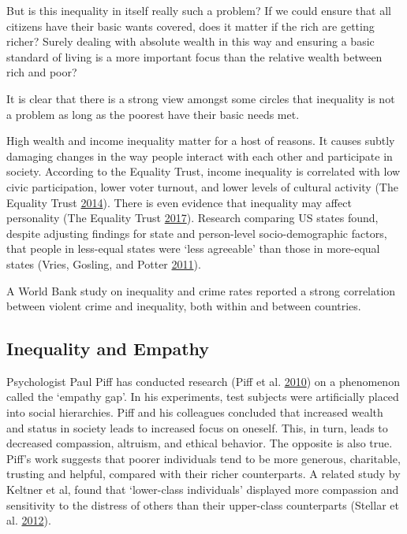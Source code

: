 \documentclass[]{tufte-handout}
\begin{document}
But is this inequality in itself really such a problem? If we could
ensure that all citizens have their basic wants covered, does it matter
if the rich are getting richer? Surely dealing with absolute wealth in
this way and ensuring a basic standard of living is a more important
focus than the relative wealth between rich and poor?

It is clear that there is a strong view amongst some circles that
inequality is not a problem as long as the poorest have their basic
needs met.

High wealth and income inequality matter for a host of reasons. It
causes subtly damaging changes in the way people interact with each
other and participate in society. According to the Equality Trust,
income inequality is correlated with low civic participation, lower
voter turnout, and lower levels of cultural activity (The Equality Trust
\protect\hyperlink{ref-EqualityTrust2014}{2014}). There is even evidence
that inequality may affect personality (The Equality Trust
\protect\hyperlink{ref-EqualityTrust2017}{2017}). Research comparing US
states found, despite adjusting findings for state and person-level
socio-demographic factors, that people in less-equal states were `less
agreeable' than those in more-equal states (Vries, Gosling, and Potter
\protect\hyperlink{ref-DeVries2011}{2011}).

A World Bank study on inequality and crime rates reported a strong
correlation between violent crime and inequality, both within and
between countries.

\hypertarget{inequality-and-empathy}{%
\subsection{Inequality and Empathy}\label{inequality-and-empathy}}

Psychologist Paul Piff has conducted research (Piff et al.
\protect\hyperlink{ref-Piff2010}{2010}) on a phenomenon called the
`empathy gap'. In his experiments, test subjects were artificially
placed into social hierarchies. Piff and his colleagues concluded that
increased wealth and status in society leads to increased focus on
oneself. This, in turn, leads to decreased compassion, altruism, and
ethical behavior. The opposite is also true. Piff's work suggests that
poorer individuals tend to be more generous, charitable, trusting and
helpful, compared with their richer counterparts. A related study by
Keltner et al, found that `lower-class individuals' displayed more
compassion and sensitivity to the distress of others than their
upper-class counterparts (Stellar et al.
\protect\hyperlink{ref-Stellar2012}{2012}).
\end{document}
